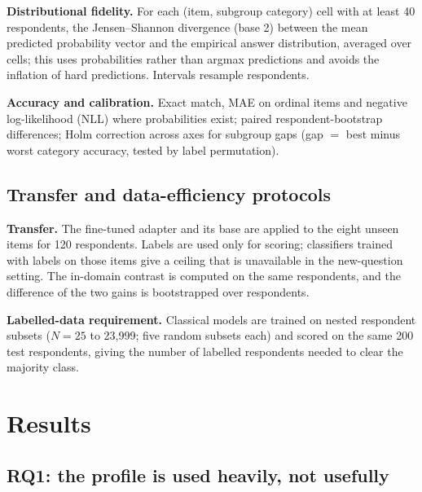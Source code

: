 \documentclass[conference]{IEEEtran}
\begin{document}
\textbf{Distributional fidelity.} For each (item, subgroup category) cell with at least 40 respondents, the Jensen--Shannon divergence (base 2) between the mean predicted probability vector and the empirical answer distribution, averaged over cells; this uses probabilities rather than argmax predictions and avoids the inflation of hard predictions. Intervals resample respondents.

\textbf{Accuracy and calibration.} Exact match, MAE on ordinal items and negative log-likelihood (NLL) where probabilities exist; paired respondent-bootstrap differences; Holm correction across axes for subgroup gaps (gap $=$ best minus worst category accuracy, tested by label permutation).

\subsection{Transfer and data-efficiency protocols}

\textbf{Transfer.} The fine-tuned adapter and its base are applied to the eight unseen items for 120 respondents. Labels are used only for scoring; classifiers trained with labels on those items give a ceiling that is unavailable in the new-question setting. The in-domain contrast is computed on the same respondents, and the difference of the two gains is bootstrapped over respondents.

\textbf{Labelled-data requirement.} Classical models are trained on nested respondent subsets ($N=25$ to 23{,}999; five random subsets each) and scored on the same 200 test respondents, giving the number of labelled respondents needed to clear the majority class.

\section{Results}

\subsection{RQ1: the profile is used heavily, not usefully}

\begin{table}[!t]
\caption{Pew, 200 held-out respondents (1{,}548 rows; the direction and variance columns exclude one non-ordinal item, 1{,}351 rows and 182 cells). Dir.\ $r$: correlation between predicted and true group differences. Profile var.: share of variance explained by the profile beyond item effects.}
\label{tab:controls}
\centering
\scriptsize

\end{table}
\end{document}
